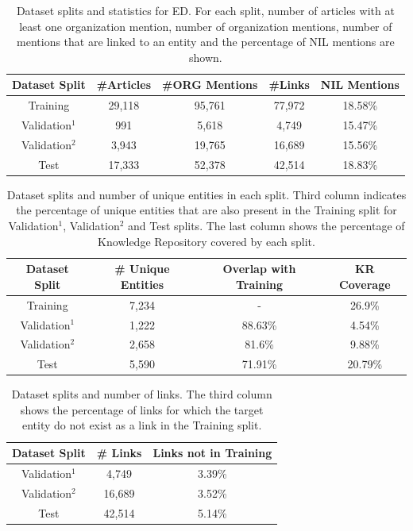 \documentclass{report}
\theoremstyle{definition}
\theoremstyle{remark}
\begin{document}
\begin{table}[h!]
    \centering
    \begin{tabular}{ccccc}
    Dataset Split & \#Articles & \#ORG Mentions & \#Links & NIL Mentions  \\
    \hline
    Training & 29,118 & 95,761 & 77,972 & 18.58\% \\
    Validation$^1$ & 991 & 5,618 & 4,749 & 15.47\% \\
    Validation$^2$ & 3,943 & 19,765 & 16,689 & 15.56\% \\
    Test & 17,333 & 52,378 & 42,514 & 18.83\% \\ 
    \end{tabular}
    \caption{Dataset splits and statistics for ED. For each split, number of articles with at least one organization mention, number of organization mentions, number of mentions that are linked to an entity and the percentage of NIL mentions are shown.}
    \label{tab:goldstatsed}
\end{table}

\begin{table}[h!]
    \centering
    \begin{tabular}{cccc}
    Dataset Split & \# Unique Entities & Overlap with Training & KR Coverage\\
    \hline
    Training & 7,234 & - & 26.9\%\\
    Validation$^1$ & 1,222 & 88.63\% & 4.54\%\\
    Validation$^2$ & 2,658 & 81.6\% & 9.88\%\\
    Test & 5,590 & 71.91\%& 20.79\%\\
    \end{tabular}
    \caption{Dataset splits and number of unique entities in each split. Third column indicates the percentage of unique entities that are also present in the Training split for Validation$^1$, Validation$^2$ and Test splits. The last column shows the percentage of Knowledge Repository covered by each split.}
    \label{tab:goldstatsed2}
\end{table}

\begin{table}[h!]
    \centering
    \begin{tabular}{ccc}
    Dataset Split & \# Links & Links not in Training\\
    \hline
    Validation$^1$ & 4,749 & 3.39\% \\
    Validation$^2$ & 16,689 & 3.52\% \\
    Test & 42,514 & 5.14\% \\
    \end{tabular}
    \caption{Dataset splits and number of links. The third column shows the percentage of links for which the target entity do not exist as a link in the Training split.}
    \label{tab:goldstatsed3}
\end{table}
\end{document}
